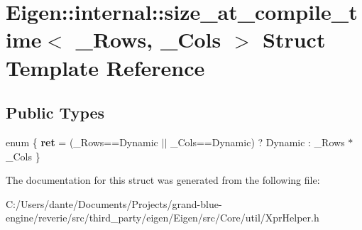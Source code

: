 \hypertarget{struct_eigen_1_1internal_1_1size__at__compile__time}{}\section{Eigen\+::internal\+::size\+\_\+at\+\_\+compile\+\_\+time$<$ \+\_\+\+Rows, \+\_\+\+Cols $>$ Struct Template Reference}
\label{struct_eigen_1_1internal_1_1size__at__compile__time}
\subsection*{Public Types}
\begin{DoxyCompactItemize}
\item 
\mbox{\label{struct_eigen_1_1internal_1_1size__at__compile__time_a9433e419c0a12a4478f461fde3148890}} 
enum \{ {\bfseries ret} = (\+\_\+\+Rows==Dynamic $\vert$$\vert$ \+\_\+\+Cols==Dynamic) ? Dynamic \+: \+\_\+\+Rows $\ast$ \+\_\+\+Cols
 \}
\end{DoxyCompactItemize}


The documentation for this struct was generated from the following file\+:\begin{DoxyCompactItemize}
\item 
C\+:/\+Users/dante/\+Documents/\+Projects/grand-\/blue-\/engine/reverie/src/third\+\_\+party/eigen/\+Eigen/src/\+Core/util/Xpr\+Helper.\+h\end{DoxyCompactItemize}
